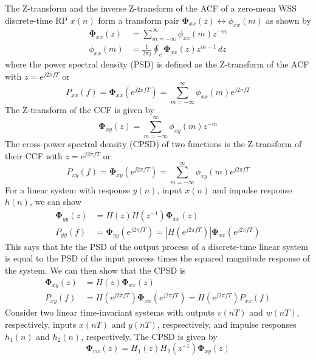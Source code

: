 \documentclass[11pt]{book}
\theoremstyle{example}
\begin{document}
The Z-transform and the inverse Z-transform of the ACF of a zero-mean WSS discrete-time RP $x(n)$ form a transform pair $\mathbf{\Phi}_{xx}(z)\leftrightarrow\phi_{xx}(m)$ as shown by
\begin{align}
	\mathbf{\Phi}_{xx}(z)&=\sum_{m=-\infty}^{\infty}{\phi_{xx}(m)z^{-m}}\\
	\phi_{xx}(m)&=\frac{1}{2{\pi}j}\oint_c{\mathbf{\Phi}_{xx}(z)z^{m-1}\,dz}
\end{align}
where the power spectral density (PSD) is defined as the Z-transform of the ACF with $z=e^{j2{\pi}fT}$ or
\begin{equation}
	P_{xx}(f)=\mathbf{\Phi}_{xx}(e^{j2{\pi}fT})=\sum_{m=-\infty}^{\infty}{\phi_{xx}(m)e^{j2{\pi}fT}}
\end{equation}
The Z-transform of the CCF is given by
\begin{equation}
	\mathbf{\Phi}_{xy}(z)=\sum_{m=-\infty}^{\infty}{\phi_{xy}(m)z^{-m}}
\end{equation}
The cross-power spectral density (CPSD) of two functions is the Z-transform of their CCF with $z=e^{j2{\pi}fT}$ or
\begin{equation}
	P_{xy}(f)=\mathbf{\Phi}_{xy}(e^{j2{\pi}fT})=\sum_{m=-\infty}^{\infty}{\phi_{xy}(m)e^{j2{\pi}fT}}
\end{equation}
For a linear system with response $y(n)$, input $x(n)$ and impulse response $h(n)$, we can show
\begin{align}
	\mathbf{\Phi}_{yy}(z)&=H(z)H(z^{-1})\mathbf{\Phi}_{xx}(z)\\
	P_{yy}(f)&=\mathbf{\Phi}_{yy}(e^{j2{\pi}fT})=|H(e^{j2{\pi}fT})|\mathbf{\Phi}_{xx}(e^{j2{\pi}fT})
\end{align}
This says that hte the PSD of the output process of a discrete-time linear system is equal to the PSD of the input process times the squared magnitude response of the system. We can then show that the CPSD is
\begin{align}
	\mathbf{\Phi}_{xy}(z)&=H(z)\mathbf{\Phi}_{xx}(z)\\
	P_{xy}(f)&=H(e^{j2{\pi}fT})\mathbf{\Phi}_{xx}(e^{j2{\pi}fT})=H(e^{j2{\pi}fT})P_{xx}(f)
\end{align}
Consider two linear time-invariant systems with outputs $v(nT)$ and $w(nT)$, respectively, inputs $x(nT)$ and $y(nT)$, respsectively, and impulse responses $h_1(n)$ and $h_2(n)$, respectively. The CPSD is given by
\begin{equation}
	\mathbf{\Phi}_{vw}(z)=H_1(z)H_2(z^{-1})\mathbf{\Phi}_{xy}(z)
\end{equation}
\end{document}
